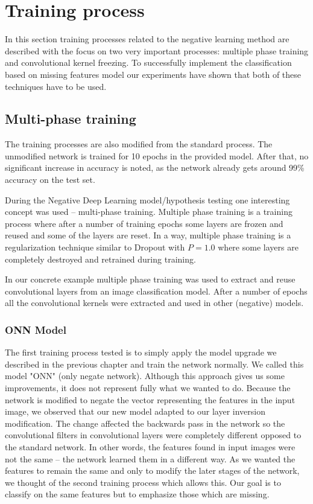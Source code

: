 \documentclass[b5paper]{book}
\begin{document}
\section{Training process}

In this section training processes related to the negative learning method are described with the focus on two very important processes: multiple phase training and convolutional kernel freezing. To successfully implement the classification based on missing features model our experiments have shown that both of these techniques have to be used.

\subsection{Multi-phase training}

The training processes are also modified from the standard process. The unmodified network is trained for 10 epochs in the provided model. After that, no significant increase in accuracy is noted, as the network already gets around 99\% accuracy on the test set.

During the Negative Deep Learning model/hypothesis testing one interesting concept was used -- multi-phase training. Multiple phase training is a training process where after a number of training epochs some layers are frozen and reused and some of the layers are reset. In a way, multiple phase training is a regularization technique similar to Dropout with \(P = 1.0\) where some layers are completely destroyed and retrained during training. 

In our concrete example multiple phase training was used to extract and reuse convolutional layers from an image classification model. After a number of epochs all the convolutional kernels were extracted and used in other (negative) models.

\subsubsection{ONN Model}

The first training process tested is to simply apply the model upgrade we described in the previous chapter and train the network normally. We called this model "ONN" (only negate network). Although this approach gives us some improvements, it does not represent fully what we wanted to do. Because the network is modified to negate the vector representing the features in the input image, we observed that our new model adapted to our layer inversion modification. The change affected the backwards pass in the network so the convolutional filters in convolutional layers were completely different opposed to the standard network. In other words, the features found in input images were not the same -- the network learned them in a different way. As we wanted the features to remain the same and only to modify the later stages of the network, we thought of the second training process which allows this. Our goal is to classify on the same features but to emphasize those which are missing.
\end{document}
